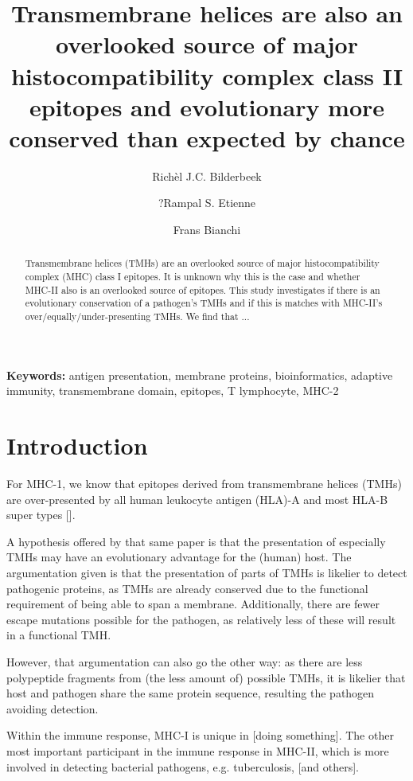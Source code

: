 \documentclass{article}
\title{
  Transmembrane helices are also 
  an overlooked source of major histocompatibility complex class II epitopes
  and evolutionary more conserved than expected by chance
}
\author[1]{Rich\`el J.C. Bilderbeek}
\author[1]{?Rampal S. Etienne}
\author[2]{Frans Bianchi}
\affil[1]{Groningen Institute for Evolutionary Life Sciences, University of Groningen, Groningen, The Netherlands}
\affil[2]{Frans' Institute, University of Groningen, Groningen, The Netherlands}
\begin{document}
\maketitle

\begin{abstract}

Transmembrane helices (TMHs) are an overlooked source of 
major histocompatibility complex (MHC) class I epitopes.
It is unknown why this is the case and 
whether MHC-II also is an overlooked source of epitopes.
This study investigates if there is an evolutionary conservation 
of a pathogen's TMHs and if this is matches 
with MHC-II's over/equally/under-presenting TMHs.
We find that ...
\end{abstract}

{\bf Keywords:} antigen presentation, membrane proteins, bioinformatics, 
adaptive immunity, transmembrane domain, epitopes, T lymphocyte, MHC-2

\section{Introduction}

For MHC-1, we know that epitopes derived from transmembrane helices (TMHs) are 
over-presented by all human leukocyte antigen (HLA)-A and most HLA-B super 
types [\cite{bianchi2017transmembrane}].

A hypothesis offered by that same paper is that the presentation of 
especially TMHs may have an evolutionary advantage for the (human) host.
The argumentation given is that the presentation of parts of TMHs
is likelier to detect pathogenic proteins, as TMHs are already conserved
due to the functional requirement of being able to span a membrane.
Additionally, there are fewer escape mutations possible for the pathogen,
as relatively less of these will result in a functional TMH.

However, that argumentation can also go the other way: as there are less
polypeptide fragments from (the less amount of) possible TMHs, 
it is likelier that host and pathogen
share the same protein sequence, 
resulting the pathogen avoiding detection.

Within the immune response, MHC-I is unique in [doing something].
The other most important participant in the immune response in MHC-II,
which is more involved in detecting bacterial pathogens, 
e.g. tuberculosis, [and others].
\end{document}
